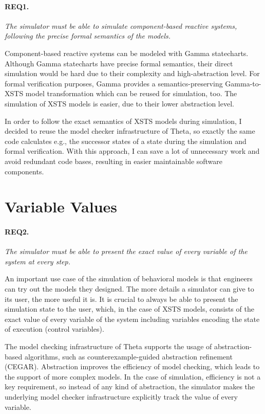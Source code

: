 \paragraph{REQ1.} \textit{The simulator must be able to simulate component-based reactive systems, following the precise formal semantics of the models.}

Component-based reactive systems can be modeled with Gamma statecharts. Although Gamma statecharts have precise formal semantics, their direct simulation would be hard due to their complexity and high-abstraction level. For formal verification purposes, Gamma provides a semantics-preserving Gamma-to-XSTS model transformation which can be reused for simulation, too. The simulation of XSTS models is easier, due to their lower abstraction level.

In order to follow the exact semantics of XSTS models during simulation, I decided to reuse the model checker infrastructure of Theta, so exactly the same code calculates e.g., the successor states of a state during the simulation and formal verification. With this approach, I can save a lot of unnecessary work and avoid redundant code bases, resulting in easier maintainable software components.

\section{Variable Values}\label{sec:req-varvals}

\paragraph{REQ2.} \textit{The simulator must be able to present the exact value of every variable of the system at every step.}

An important use case of the simulation of behavioral models is that engineers can try out the models they designed. The more details a simulator can give to its user, the more useful it is. It is crucial to always be able to present the simulation state to the user, which, in the case of XSTS models, consists of the exact value of every variable of the system including variables encoding the state of execution (control variables).

The model checking infrastructure of Theta supports the usage of abstraction-based algorithms, such as counterexample-guided abstraction refinement (CEGAR). Abstraction improves the efficiency of model checking, which leads to the support of more complex models. In the case of simulation, efficiency is not a key requirement, so instead of any kind of abstraction, the simulator makes the underlying model checker infrastructure explicitly track the value of every variable.

